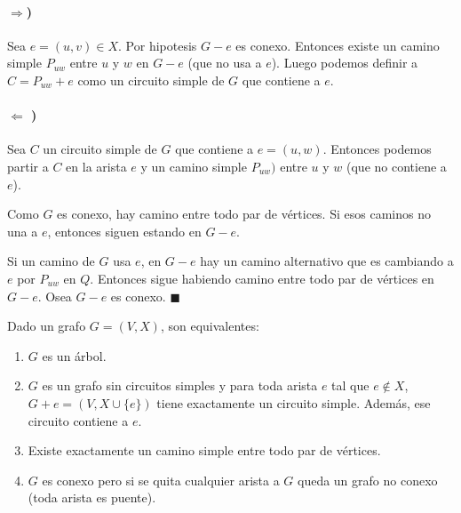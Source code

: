 \begin{demo} 
	\paragraph{\(\Rightarrow\))} Sea \(e =(u,v)\in X\). Por hipotesis \(G-e\) es conexo. Entonces existe un camino simple \(P_{uw}\) entre \(u\) y \(w\) en \(G - e\) (que no usa a \(e\)). Luego podemos definir a \(C = P_{uw} + e\) como un circuito simple de \(G\) que contiene a \(e\).
	
	\paragraph{\(\Leftarrow\) )} Sea \(C\) un circuito simple de \(G\) que contiene a \(e = (u,w)\). Entonces podemos partir a \(C\) en la arista \(e\) y un camino simple \(P_{uw})\) entre \(u\) y \(w\) (que no contiene a \(e\)).

	Como \(G\) es conexo, hay camino entre todo par de vértices. Si esos caminos no una a \(e\), entonces siguen estando en \(G-e\).
\end{demo}
\begin{demoPart} 
	Si un camino de \(G\) usa \(e\), en \(G-e\) hay un camino alternativo que es cambiando a \(e\) por \(P_{uw}\) en \(Q\). Entonces sigue habiendo camino entre todo par de vértices en \(G-e\). Osea \(G-e\) es conexo. \(\blacksquare\)
\end{demoPart}

\begin{theorem}
	Dado un grafo \(G=(V,X)\), son equivalentes:
	\begin{enumerate}
		\item \(G\) es un árbol.
		\item \(G\) es un grafo sin circuitos simples y para toda arista \(e\) tal que \(e\notin X\), \(G+e = (V, X\cup\{e\})\) tiene exactamente un circuito simple. Además, ese circuito contiene a \(e\).
		\item Existe exactamente un camino simple entre todo par de vértices.
		\item \(G\) es conexo pero si se quita cualquier arista a \(G\) queda un grafo no conexo (toda arista es puente).
	\end{enumerate}
\end{theorem}

